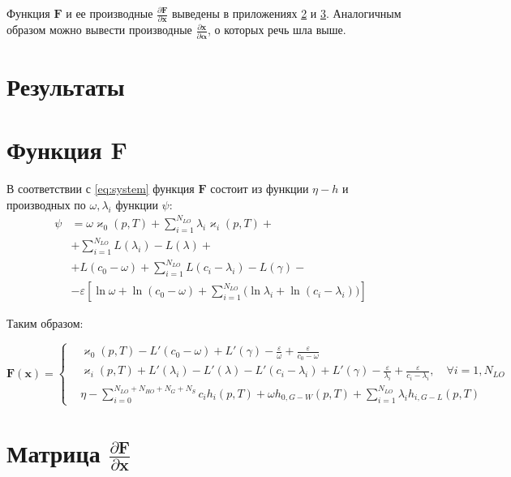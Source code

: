 \documentclass[12pt]{article}
\newcommand{\pd}[2]{\frac{\partial #1}{\partial #2}}
\begin{document}
Функция $\mathbf{F}$ и ее производные $\pd{\mathbf{F}}{\mathbf{x}}$ выведены в приложениях \ref{ap:F} и \ref{ap:dF}. Аналогичным образом можно вывести производные $\pd{\mathbf{x}}{\boldsymbol \alpha}$, о которых речь шла выше.

\section{Результаты}

\newpage



\appendix
\section{Функция $\mathbf{F}$} \label{ap:F}

В  соответствии с \eqref{eq:system} функция $\mathbf{F}$ состоит из функции $\eta - h$ и производных по $\omega, \lambda_i$ функции
$\psi$:
\begin{align*}
\psi &= \omega \varkappa_0(p,T) + \sum_{i=1}^{N_{LO}} \lambda_i \varkappa_i(p,
T) +\\
&+ \sum_{i=1}^{N_{LO}} L(\lambda_i) - L(\lambda) + \\
&+ L(c_0 - \omega) + \sum_{i=1}^{N_{LO}} L(c_i - \lambda_i) 
- L(\gamma) - \\
&- \varepsilon \left[
\ln \omega + \ln (c_0 - \omega) + 
\sum_{i=1}^{N_{LO}} \Big( \ln \lambda_i
+ \ln (c_i - \lambda_i) \Big) 
\right]
\end{align*}

Таким образом:

\[
\mathbf{F(\mathbf x )} = \left\{
\begin{aligned}
&\varkappa_0(p, T) - L'(c_0 - \omega) + L'(\gamma) 
- \frac{\varepsilon}{\omega} + \frac{\varepsilon}{c_0 - \omega}\\
&\varkappa_i(p, T) + L'(\lambda_i) - L'(\lambda)
- L'(c_i - \lambda_i) + L'(\gamma) - \frac{\varepsilon}{\lambda_i}
+ \frac{\varepsilon}{c_i - \lambda_i}, \quad \forall i=1,N_{LO}\\
&\eta - \sum_{i=0}^{N_{LO}+N_{HO}+N_{G}+N_{S}} c_i h_i(p,T)
+\omega h_{0,G-W}(p,T) 
+\sum_{i=1}^{N_{LO}} \lambda_i h_{i,G-L}(p,T)
\end{aligned}
\right.
\]

\section{Матрица $\pd{\mathbf{F}}{\mathbf{x}}$} \label{ap:dF}
\end{document}
